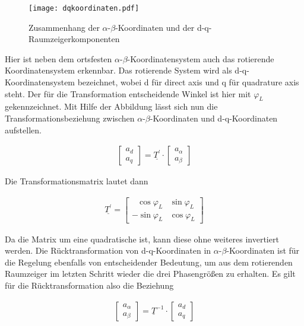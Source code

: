 \begin{figure}[h]
	\centering
	\texttt{[image: dqkoordinaten.pdf]}
	\label{fig:dqkoordinaten}
	\caption{Zusammenhang der $\alpha$-$\beta$-Koordinaten und der d-q- Raumzeigerkomponenten}
\end{figure}


Hier ist neben dem ortsfesten $\alpha$-$\beta$-Koordinatensystem auch das rotierende Koordinatensystem erkennbar. 
Das rotierende System wird als d-q-Koordinatensystem bezeichnet, wobei d für direct axis und q für quadrature axis steht.
Der für die Transformation entscheidende Winkel ist hier mit $\varphi_{L}$ gekennzeichnet.
Mit Hilfe der Abbildung lässt sich nun die Transformationsbeziehung zwischen $\alpha$-$\beta$-Koordinaten und d-q-Koordinaten aufstellen.

\begin{align}
	\begin{bmatrix}
		a_{d} \\
		a_{q} 
	\end{bmatrix}
	=\underline{T^\prime}\cdot 
	\begin{bmatrix}
		a_{\alpha} \\
		a_{\beta}
	\end{bmatrix}
	\label{parkvektor}
\end{align}

Die Transformationsmatrix lautet dann

\begin{align}
	\underline{T^\prime} =
	\begin{bmatrix}
		~~~\cos{\varphi_{L}} & \sin{\varphi_{L}} \\
		-\sin{\varphi_{L}} & \cos{\varphi_{L}}
	\end{bmatrix}
	\label{parkmatrix}
\end{align}

Da die Matrix um eine quadratische ist, kann diese ohne weiteres invertiert werden.
Die Rücktransformation von d-q-Koordinaten in $\alpha$-$\beta$-Koordinaten ist für die Regelung ebenfalls von entscheidender Bedeutung, um aus dem rotierenden Raumzeiger im letzten Schritt wieder die drei Phasengrößen zu erhalten. 
Es gilt für die Rücktransformation also die Beziehung

\begin{align}
	\begin{bmatrix}
		a_{\alpha} \\
		a_{\beta}
	\end{bmatrix}
	=\underline{T}^{-1}\cdot 
	\begin{bmatrix}
		a_{d} \\
		a_{q} 
	\end{bmatrix}
	\label{parkvektorinvers}
\end{align}

